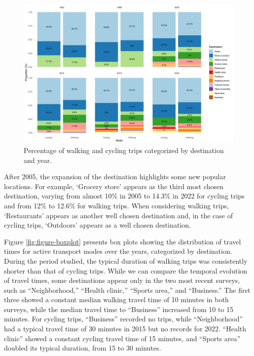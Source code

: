 \documentclass[preprint, 3p,
authoryear]{elsarticle} %
\begin{document}
\begin{figure}
\includegraphics[width=1\linewidth]{figures/destination_percentual} \caption{Percentage of walking and cycling trips categorized by destination and year.}\label{fig:figure-destmodeyearperc}
\end{figure}

After 2005, the expansion of the destination highlights some new popular
locations. For example, `Grocery store' appears as the third most chosen
destination, varying from almost 10\% in 2005 to 14.3\% in 2022 for
cycling trips and from 12\% to 12.6\% for walking trips. When
considering walking trips, `Restaurants' appears as another well chosen
destination and, in the case of cycling trips, `Outdoors' appears as a
well chosen destination.

Figure \ref{fig:figure-boxplot} presents box plots showing the
distribution of travel times for active transport modes over the years,
categorized by destination. During the period studied, the typical
duration of walking trips was consistently shorter than that of cycling
trips. While we can compare the temporal evolution of travel times, some
destinations appear only in the two most recent surveys, such as
``Neighborhood,'' ``Health clinic,'' ``Sports area,'' and ``Business.''
The first three showed a constant median walking travel time of 10
minutes in both surveys, while the median travel time to ``Business''
increased from 10 to 15 minutes. For cycling trips, ``Business''
recorded no trips, while ``Neighborhood'' had a typical travel time of
30 minutes in 2015 but no records for 2022. ``Health clinic'' showed a
constant cycling travel time of 15 minutes, and ``Sports area'' doubled
its typical duration, from 15 to 30 minutes.
\end{document}
